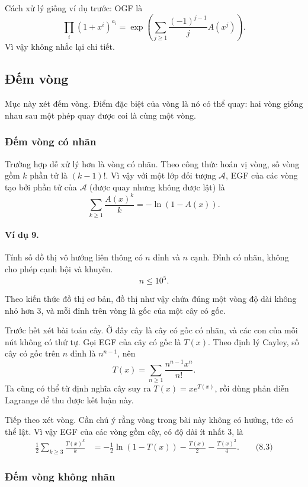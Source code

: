 \documentclass[11pt]{article}
\begin{document}
Cách xử lý giống ví dụ trước: OGF là
\[
  \prod_i(1+x^i)^{a_i}
  =\exp\left(\sum_{j\ge 1}\frac{(-1)^{j-1}}j A(x^j)\right).
\]
Vì vậy không nhắc lại chi tiết.

\subsection{Đếm vòng}

Mục này xét đếm vòng. Điểm đặc biệt của vòng là nó có thể quay: hai vòng giống
nhau sau một phép quay được coi là cùng một vòng.

\subsubsection{Đếm vòng có nhãn}

Trường hợp dễ xử lý hơn là vòng có nhãn. Theo công thức hoán vị vòng, số vòng
gồm \(k\) phần tử là \((k-1)!\). Vì vậy với một lớp đối tượng \(\mathcal A\),
EGF của các vòng tạo bởi phần tử của \(\mathcal A\) (được quay nhưng không được
lật) là
\[
  \sum_{k\ge 1}\frac{A(x)^k}{k}=-\ln(1-A(x)). \tag{8.1}
\]

\paragraph{Ví dụ 9.}
Tính số đồ thị vô hướng liên thông có \(n\) đỉnh và \(n\) cạnh. Đỉnh có nhãn,
không cho phép cạnh bội và khuyên.
\[
  n\le 10^5.
\]

Theo kiến thức đồ thị cơ bản, đồ thị như vậy chứa đúng một vòng độ dài không
nhỏ hơn \(3\), và mỗi đỉnh trên vòng là gốc của một cây có gốc.

Trước hết xét bài toán cây. Ở đây cây là cây có gốc có nhãn, và các con của mỗi
nút không có thứ tự. Gọi EGF của cây có gốc là \(T(x)\). Theo định lý Cayley,
số cây có gốc trên \(n\) đỉnh là \(n^{n-1}\), nên
\[
  T(x)=\sum_{n\ge 1}\frac{n^{n-1}x^n}{n!}. \tag{8.2}
\]
Ta cũng có thể từ định nghĩa cây suy ra \(T(x)=xe^{T(x)}\), rồi dùng phản diễn
Lagrange để thu được kết luận này.

Tiếp theo xét vòng. Cần chú ý rằng vòng trong bài này không có hướng, tức có
thể lật. Vì vậy EGF của các vòng gồm cây, có độ dài ít nhất \(3\), là
\[
\begin{aligned}
  \frac12\sum_{k\ge 3}\frac{T(x)^k}{k}
  &=-\frac12\ln(1-T(x))-\frac{T(x)}2-\frac{T(x)^2}{4}. \qquad\text{(8.3)}
\end{aligned}
\]

\subsubsection{Đếm vòng không nhãn}
\end{document}
